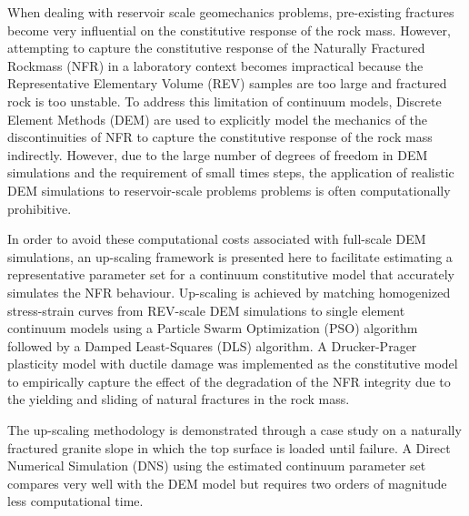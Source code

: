 When dealing with reservoir scale geomechanics problems, pre-existing fractures become very influential on the constitutive response of the rock mass. However, attempting to capture the constitutive response of the Naturally Fractured Rockmass (NFR) in a laboratory context becomes impractical because the Representative Elementary Volume (REV) samples are too large and fractured rock is too unstable. To address this limitation of continuum models, Discrete Element Methods (DEM) are used to explicitly model the mechanics of the discontinuities of NFR to capture the constitutive response of the rock mass indirectly. However, due to the large number of degrees of freedom in DEM simulations and the requirement of small times steps, the application of realistic DEM simulations to reservoir-scale problems problems is often computationally prohibitive. 

In order to avoid these computational costs associated with full-scale DEM simulations, an up-scaling framework is presented here to facilitate estimating a representative parameter set for a continuum constitutive model that accurately simulates the NFR behaviour. Up-scaling is achieved by matching homogenized stress-strain curves from REV-scale DEM simulations to single element continuum models using a Particle Swarm Optimization (PSO) algorithm followed by a Damped Least-Squares (DLS) algorithm. A Drucker-Prager plasticity model with ductile damage was implemented as the constitutive model to empirically capture the effect of the degradation of the NFR integrity due to the yielding and sliding of natural fractures in the rock mass.

The up-scaling methodology is demonstrated through a case study on a naturally fractured granite slope in which the top surface is loaded until failure. A Direct Numerical Simulation (DNS) using the estimated continuum parameter set compares very well with the DEM model but requires two orders of magnitude less computational time.